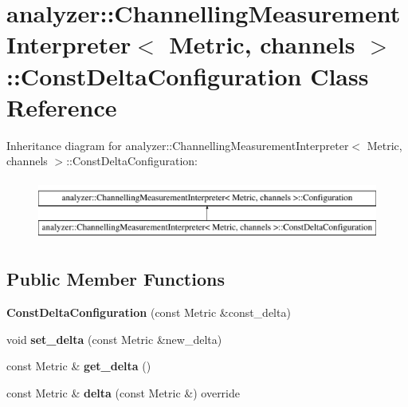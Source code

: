 \hypertarget{classanalyzer_1_1_channelling_measurement_interpreter_1_1_const_delta_configuration}{}\section{analyzer\+::Channelling\+Measurement\+Interpreter$<$ Metric, channels $>$\+::Const\+Delta\+Configuration Class Reference}
\label{classanalyzer_1_1_channelling_measurement_interpreter_1_1_const_delta_configuration}
Inheritance diagram for analyzer\+::Channelling\+Measurement\+Interpreter$<$ Metric, channels $>$\+::Const\+Delta\+Configuration\+:\begin{figure}[H]
\begin{center}
\leavevmode
\includegraphics[height=2.000000cm]{classanalyzer_1_1_channelling_measurement_interpreter_1_1_const_delta_configuration}
\end{center}
\end{figure}
\subsection*{Public Member Functions}
\begin{DoxyCompactItemize}
\item 
\mbox{\label{classanalyzer_1_1_channelling_measurement_interpreter_1_1_const_delta_configuration_a81f4fbd7fff5a9600d8e5e56c764e453}} 
{\bfseries Const\+Delta\+Configuration} (const Metric \&const\+\_\+delta)
\item 
\mbox{\label{classanalyzer_1_1_channelling_measurement_interpreter_1_1_const_delta_configuration_a1336c30a4882340dfd24644f427d8a5d}} 
void {\bfseries set\+\_\+delta} (const Metric \&new\+\_\+delta)
\item 
\mbox{\label{classanalyzer_1_1_channelling_measurement_interpreter_1_1_const_delta_configuration_a9f275ee54d4bd6b6e3c72370561a3974}} 
const Metric \& {\bfseries get\+\_\+delta} ()
\item 
\mbox{\label{classanalyzer_1_1_channelling_measurement_interpreter_1_1_const_delta_configuration_ae9f70fc37f0934fd2aac9051f16aaed3}} 
const Metric \& {\bfseries delta} (const Metric \&) override
\end{DoxyCompactItemize}
